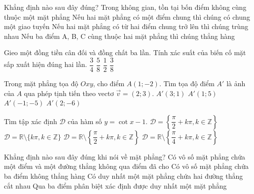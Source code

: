 \begin{ex}%
	Khẳng định nào sau đây đúng?
	\choice
	{\True Trong không gian, tồn tại bốn điểm không cùng thuộc một mặt phẳng}
	{Nếu hai mặt phẳng có một điểm chung thì chúng có chung một giao tuyến}
	{Nếu hai mặt phẳng có từ hai điểm chung trở lên thì chúng trùng nhau}
	{Nếu ba điểm A, B, C cùng thuộc hai mặt phẳng thì chúng thẳng hàng}
\end{ex}
\begin{ex}%
	Gieo một đồng tiền cân đối và đồng chất ba lần. Tính xác suất của biến cố mặt sấp xuất hiện đúng hai lần.
	\choice
	{$\dfrac{3}{4}$}
	{$\dfrac{5}{8}$}
	{$\dfrac{1}{2}$}
	{\True $\dfrac{3}{8}$}
\end{ex}
\begin{ex}%
	Trong mặt phẳng tọa độ $Oxy$, cho điểm $A(1;-2)$. Tìm tọa độ điểm $A'$ là ảnh của $A$ qua phép tịnh tiến theo vectơ $\overrightarrow{v}=(2;3)$.
	\choice
	{\True $A'(3; 1)$}
	{$A'(1; 5)$}
	{$A'(-1; -5)$}
	{$A'(2; -6)$}
\end{ex}
\begin{ex}%
	Tìm tập xác định $\mathscr D$ của hàm số $y=\cot x-1$.
	\choice
	{$\mathscr D= \left\{\dfrac{\pi}{2} +k\pi, k\in \mathbb{Z}\right\}$}
	{\True $\mathscr D=\mathbb{R}\setminus \{k\pi, k\in\mathbb{Z}\}$}
	{$\mathscr D=\mathbb{R}\setminus \left\{\dfrac{\pi}{2} +k\pi, k\in \mathbb{Z}\right\}$}
	{$\mathscr D=\mathbb{R}\setminus \left\{\dfrac{\pi}{4} +k\pi, k\in \mathbb{Z}\right\}$}
\end{ex}
\begin{ex}%
	Khẳng định nào sau đây đúng khi nói về mặt phẳng?
	\choice
	{Có vô số mặt phẳng chứa một điểm và một đường thẳng không qua điểm đã cho}
	{Có vô số mặt phẳng chứa ba điểm không thẳng hàng}
	{\True Có duy nhất một mặt phẳng chứa hai đường thẳng cắt nhau}
	{Qua ba điểm phân biệt xác định được duy nhất một mặt phẳng}
\end{ex}
